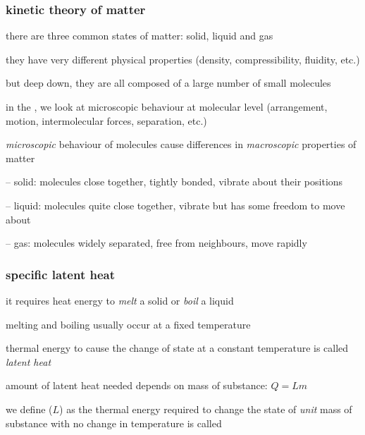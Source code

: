 \subsubsection{kinetic theory of matter}

there are three common states of matter: solid, liquid and gas

they have very different physical properties (density, compressibility, fluidity, etc.)

but deep down, they are all composed of a large number of small molecules

in the , we look at microscopic behaviour at molecular level (arrangement, motion, intermolecular forces, separation, etc.)

\emph{microscopic} behaviour of molecules cause differences in \emph{macroscopic} properties of matter

\begin{compactitem}
	\item[--] solid: molecules close together, tightly bonded, vibrate about their positions
	
	\item[--] liquid: molecules quite close together, vibrate but has some freedom to move about
	
	\item[--] gas: molecules widely separated, free from neighbours, move rapidly
\end{compactitem}

\subsubsection{specific latent heat}

it requires heat energy to \emph{melt} a solid or \emph{boil} a liquid

melting and boiling usually occur at a fixed temperature

thermal energy to cause the change of state at a constant temperature is called \emph{latent heat}

amount of latent heat needed depends on mass of substance: $\boxed{Q=Lm}$

\begin{ilight}
	we define  ($L$) as the thermal energy required to change the state of \emph{unit} mass of substance with no change in temperature is called 
\end{ilight}




